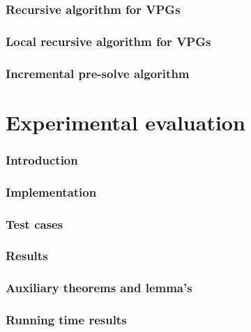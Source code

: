 \documentclass[]{article}
\begin{document}
\section{Recursive algorithm for VPGs}


\section{Local recursive algorithm for VPGs}


\section{Incremental pre-solve algorithm}


\pagebreak
\part{Experimental evaluation}
\section{Introduction}


\section{Implementation}


\section{Test cases}


\section{Results}


\pagebreak
\begin{appendices}
\section{Auxiliary theorems and lemma's}
\label{appendix:proves}

\section{Running time results}
\label{appendix:resultsexact}

\end{appendices}

 

\end{document}
